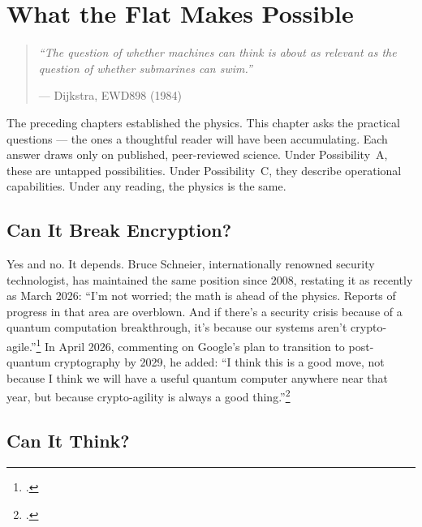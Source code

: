 
\chapter{What the Flat Makes Possible}
\label{spine:capabilities}

\begin{quote}\small\textit{%
``The question of whether machines can think is about as relevant as the question of whether submarines can swim.''%
}\par\raggedleft --- Dijkstra, EWD898 (1984)\end{quote}

\vspace{0.5cm}

The preceding chapters established the physics. This chapter asks the practical questions --- the ones a thoughtful reader will have been accumulating. Each answer draws only on published, peer-reviewed science. Under Possibility~A, these are untapped possibilities. Under Possibility~C, they describe operational capabilities. Under any reading, the physics is the same.

\section*{Can It Break Encryption?}
\label{spine:cap-encryption}

Yes and no. It depends. Bruce Schneier, internationally renowned security technologist, has maintained the same position since 2008, restating it as recently as March 2026: ``I'm not worried; the math is ahead of the physics. Reports of progress in that area are overblown. And if there's a security crisis because of a quantum computation breakthrough, it's because our systems aren't crypto-agile.''\footcite{schneier2008quantum} In April 2026, commenting on Google's plan to transition to post-quantum cryptography by 2029, he added: ``I think this is a good move, not because I think we will have a useful quantum computer anywhere near that year, but because crypto-agility is always a good thing.''\footcite{schneier2026pqc}

\section*{Can It Think?}
\label{spine:cap-think}

